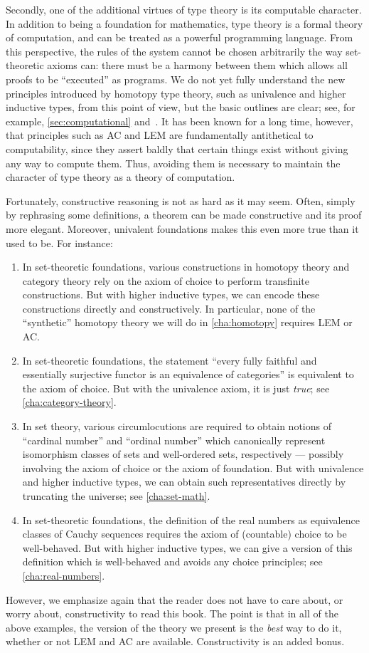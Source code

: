 Secondly, one of the additional virtues of type theory is its computable character.
In addition to being a foundation for mathematics, type theory is a formal theory of computation, and can be treated as a powerful programming language.
From this perspective, the rules of the system cannot be chosen arbitrarily the way set-theoretic axioms can: there must be a harmony between them which allows all proofs to be ``executed'' as programs.
We do not yet fully understand the new principles introduced by homotopy type theory, such as univalence and higher inductive types, from
this point of view, but the basic outlines are clear; see, for example, \autoref{sec:computational} and~\cite{lh:canonicity}.
It has been known for a long time, however, that principles such as AC and LEM are fundamentally antithetical to computability, since they assert baldly that certain things exist without giving any way to compute them.
Thus, avoiding them is necessary to maintain the character of type theory as a theory of computation.

Fortunately, constructive reasoning is not as hard as it may seem.
Often, simply by rephrasing some definitions, a theorem can be made constructive and its proof more elegant.
Moreover, univalent foundations makes this even more true than it used to be.
For instance:
\begin{enumerate}
\item In set-theoretic foundations, various constructions in homotopy theory and category theory rely on the axiom of choice to perform transfinite constructions.
  But with higher inductive types, we can encode these constructions directly and constructively.
  In particular, none of the ``synthetic'' homotopy theory we will do in \autoref{cha:homotopy} requires LEM or AC.
\item In set-theoretic foundations, the statement ``every fully faithful and essentially surjective functor is an equivalence of categories'' is equivalent to the axiom of choice.
  But with the univalence axiom, it is just \emph{true}; see \autoref{cha:category-theory}.
\item In set theory, various circumlocutions are required to obtain notions of ``cardinal number'' and ``ordinal number'' which canonically represent isomorphism classes of sets and well-ordered sets, respectively --- possibly involving the axiom of choice or the axiom of foundation.
  But with univalence and higher inductive types, we can obtain such representatives directly by truncating the universe; see \autoref{cha:set-math}.
\item In set-theoretic foundations, the definition of the real numbers as equivalence classes of Cauchy sequences requires the axiom of (countable) choice to be well-behaved.
  But with higher inductive types, we can give a version of this definition which is well-behaved and avoids any choice principles; see \autoref{cha:real-numbers}.
\end{enumerate}
However, we emphasize again that the reader does not have to care about, or worry about, constructivity to read this book.
The point is that in all of the above examples, the version of the theory we present is the \emph{best} way to do it, whether or not LEM and AC are available.
Constructivity is an added bonus.

